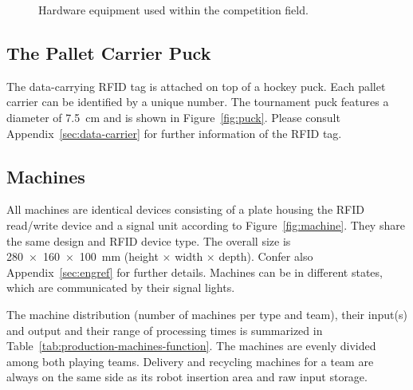\documentclass[12pt,twoside]{article}
\begin{document}
\begin{figure}
  \quad\quad
  \caption{Hardware equipment used within the competition field.}
  \label{fig:puck-machine}
\end{figure}


\subsection{The Pallet Carrier Puck}
The data-carrying RFID tag is attached on top of a hockey puck. Each
pallet carrier can be identified by a unique number. The tournament puck
features a diameter of \SI{7.5}{\centi\metre} and is shown in
Figure~\ref{fig:puck}. Please consult Appendix~\ref{sec:data-carrier} for
further information of the RFID tag.


\subsection{Machines}
\label{sec:machines}
All machines are identical devices consisting of a plate housing the RFID
read/write device and a signal unit according to
Figure~\ref{fig:machine}. They share the same design and RFID
device type. The overall size is \SI{280 x 160 x 100}{\milli\metre} (height
$\times$ width $\times$ depth). Confer also
Appendix~\ref{sec:engref} for further details. Machines can be in
different states, which are communicated by their signal lights.

The machine distribution (number of machines per type and team), their
input(s) and output and their range of processing times is summarized
in Table~\ref{tab:production-machines-function}. The machines are
evenly divided among both playing teams. Delivery and recycling
machines for a team are always on the same side as its robot insertion
area and raw input storage.
\end{document}
